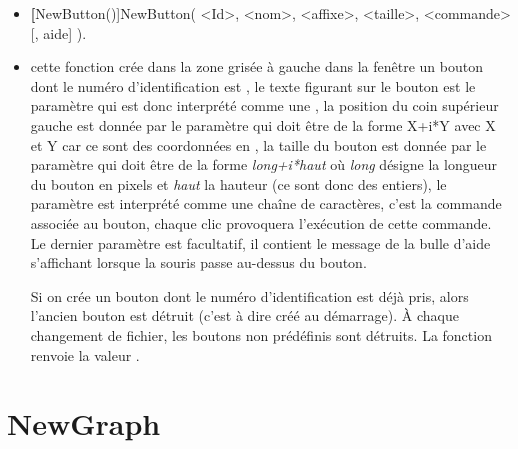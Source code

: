 \begin{itemize}
 \item \util \textbf[NewButton()]{NewButton( <Id>, <nom>, <affixe>, <taille>, <commande> [, aide] )}. 
 \item \desc cette fonction crée dans la zone grisée à gauche dans la fenêtre un bouton dont le numéro d'identification est  , le texte figurant sur le bouton est le paramètre  qui est donc interprété comme une , la position du coin supérieur gauche est donnée par le paramètre  qui doit être de la forme X+i*Y avec X et Y  car ce sont des coordonnées en , la taille du bouton est donnée par le paramètre  qui doit être de la forme \textit{long+i*haut} où \textit{long} désigne la longueur du bouton en pixels et \textit{haut} la hauteur (ce sont donc des entiers), le paramètre  est interprété comme une chaîne de caractères, c'est la commande associée au bouton, chaque clic provoquera l'exécution de cette commande. Le dernier paramètre  est facultatif, il contient le message de la bulle d'aide s'affichant lorsque la souris passe au-dessus du bouton.

 Si on crée un bouton dont le numéro d'identification est déjà pris, alors l'ancien bouton est détruit  (c'est à dire créé au démarrage). \`A chaque changement de fichier, les boutons non prédéfinis sont détruits. La fonction  renvoie la valeur \Nil.
\end{itemize}

\section{NewGraph}\label{cmdNewGraph}

